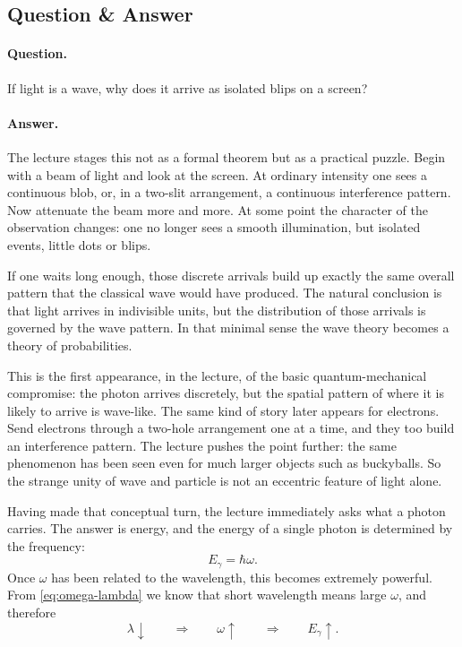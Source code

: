 \subsection{Question \& Answer}

\paragraph{Question.} If light is a wave, why does it arrive as isolated blips on a screen?

\paragraph{Answer.} The lecture stages this not as a formal theorem but as a practical puzzle. Begin with a beam of light and look at the screen. At ordinary intensity one sees a continuous blob, or, in a two-slit arrangement, a continuous interference pattern. Now attenuate the beam more and more. At some point the character of the observation changes: one no longer sees a smooth illumination, but isolated events, little dots or blips.

If one waits long enough, those discrete arrivals build up exactly the same overall pattern that the classical wave would have produced. The natural conclusion is that light arrives in indivisible units, but the distribution of those arrivals is governed by the wave pattern. In that minimal sense the wave theory becomes a theory of probabilities.

This is the first appearance, in the lecture, of the basic quantum-mechanical compromise: the photon arrives discretely, but the spatial pattern of where it is likely to arrive is wave-like. The same kind of story later appears for electrons. Send electrons through a two-hole arrangement one at a time, and they too build an interference pattern. The lecture pushes the point further: the same phenomenon has been seen even for much larger objects such as buckyballs. So the strange unity of wave and particle is not an eccentric feature of light alone.

Having made that conceptual turn, the lecture immediately asks what a photon carries. The answer is energy, and the energy of a single photon is determined by the frequency:
\begin{equation}
E_\gamma = \hbar \omega.
\end{equation}
Once \(\omega\) has been related to the wavelength, this becomes extremely powerful. From \eqref{eq:omega-lambda} we know that short wavelength means large \(\omega\), and therefore
\begin{equation}
\lambda \downarrow \qquad \Longrightarrow \qquad \omega \uparrow \qquad \Longrightarrow \qquad E_\gamma \uparrow.
\end{equation}

